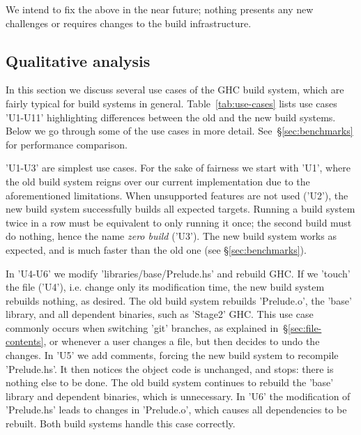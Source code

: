 \noindent We intend to fix the above in the near future; nothing presents any
new challenges or requires changes to the build infrastructure.

\subsection{Qualitative analysis\label{sec:use-cases}}

In this section we discuss several use cases of the GHC build system, which
are fairly typical for build systems in general. Table~\ref{tab:use-cases}
lists use cases \lst'U1-U11' highlighting differences between the old and the
new build systems. Below we go through some of the use cases in more detail.
See~\S\ref{sec:benchmarks} for performance comparison.

\lst'U1-U3' are simplest use cases. For the sake of fairness we start with
\lst'U1', where the old build system reigns over our current implementation due
to the aforementioned limitations. When unsupported features are not used
(\lst'U2'), the new build system successfully builds all expected targets.
Running a build system twice in a row must be equivalent to only running it
once; the second build must do nothing, hence the name \emph{zero
build} (\lst'U3'). The new build system works as expected, and is much faster
than the old one (see \S\ref{sec:benchmarks}).


In \lst'U4-U6' we modify \lst'libraries/base/Prelude.hs' and rebuild GHC.
If we \lst'touch' the file (\lst'U4'), i.e. change only its modification
time, the new build system rebuilds nothing, as desired. The old build system rebuilds
\lst'Prelude.o', the \lst'base' library, and all dependent binaries, such as
\lst'Stage2' GHC. This use case commonly occurs when switching \lst'git'
branches, as explained in~\S\ref{sec:file-contents}, or whenever a user changes
a file, but then decides to undo the changes. In \lst'U5' we add comments,
forcing the new build system to recompile \lst'Prelude.hs'. It then notices the
object code is unchanged, and stops: there is nothing else to be done. The old
build system continues to rebuild the \lst'base' library and dependent binaries,
which is unnecessary. In \lst'U6' the modification of \lst'Prelude.hs' leads to
changes in \lst'Prelude.o', which causes all dependencies to be rebuilt. Both
build systems handle this case correctly.

